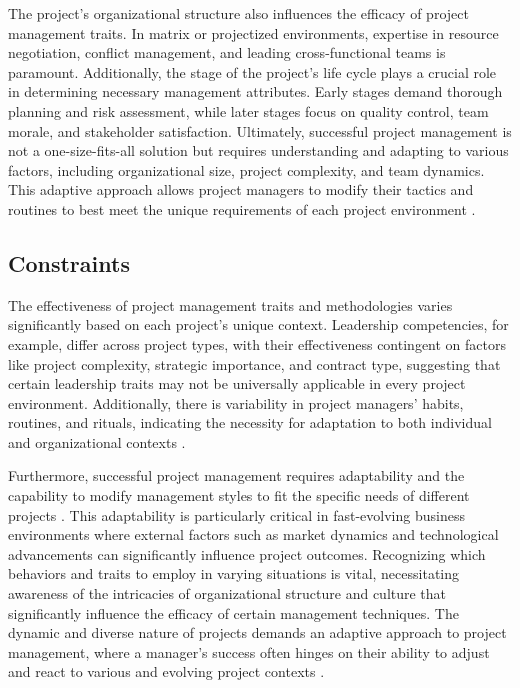 \documentclass{article}
\begin{document}
The project's organizational structure also influences the efficacy of project management traits. In matrix or projectized environments, expertise in resource negotiation, conflict management, and leading cross-functional teams is paramount. Additionally, the stage of the project's life cycle plays a crucial role in determining necessary management attributes. Early stages demand thorough planning and risk assessment, while later stages focus on quality control, team morale, and stakeholder satisfaction. Ultimately, successful project management is not a one-size-fits-all solution but requires understanding and adapting to various factors, including organizational size, project complexity, and team dynamics. This adaptive approach allows project managers to modify their tactics and routines to best meet the unique requirements of each project environment \cite{hyvari2006success}.

\subsection{Constraints}

The effectiveness of project management traits and methodologies varies significantly based on each project's unique context. Leadership competencies, for example, differ across project types, with their effectiveness contingent on factors like project complexity, strategic importance, and contract type, suggesting that certain leadership traits may not be universally applicable in every project environment\cite{muller2010leadership}. Additionally, there is variability in project managers'  habits, routines, and rituals, indicating the necessity for adaptation to both individual and organizational contexts \cite{sigurdhssonpatterns}.

Furthermore, successful project management requires adaptability and the capability to modify management styles to fit the specific needs of different projects \cite{markopoulos2005project}. This adaptability is particularly critical in fast-evolving business environments where external factors such as market dynamics and technological advancements can significantly influence project outcomes. Recognizing which behaviors and traits to employ in varying situations is vital, necessitating awareness of the intricacies of organizational structure and culture that significantly influence the efficacy of certain management techniques. The dynamic and diverse nature of projects demands an adaptive approach to project management, where a manager's success often hinges on their ability to adjust and react to various and evolving project contexts \cite{pollack2016project}.
\end{document}
